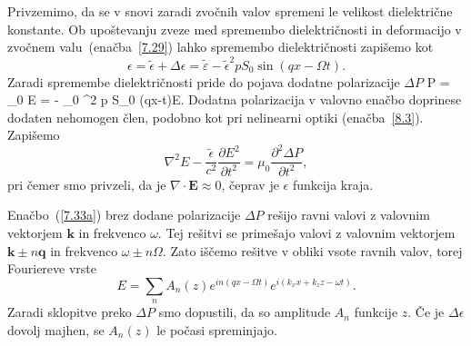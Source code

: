 Privzemimo, da se v snovi zaradi zvočnih valov spremeni le velikost
dielektrične konstante. Ob upoštevanju zveze med spremembo dielektričnosti in deformacijo
v zvočnem valu~(enačba~\ref{7.29}) lahko spremembo dielektričnosti
zapišemo kot  
\begin{equation}
\epsilon=\tilde{\epsilon}+\Delta\epsilon = 
\tilde{\varepsilon} -\tilde{\epsilon}^{2}pS_{0}\sin(qx-\Omega t).
\label{7.33}
\end{equation}
Zaradi spremembe dielektričnosti pride do pojava
dodatne polarizacije $\Delta P$
\beq
\Delta P = \varepsilon_0 \Delta \varepsilon E = - \varepsilon_0 
\tilde{\varepsilon}^2 p S_0 \sin(qx-\Omega t)E.
\eeq
Dodatna polarizacija v valovno enačbo doprinese dodaten nehomogen člen, podobno
kot pri nelinearni optiki (enačba~\ref{8.3}). Zapišemo
\begin{equation}
\nabla^{2}E-\frac{\tilde{\epsilon}}{c^{2}}{\frac{\partial E^{2}}
{\partial t^{2}}}=\mu_{0}{\frac{\partial^2 \Delta P}{\partial t^{2}}},
\label{7.33a}
\end{equation}
pri čemer smo privzeli, da je $\nabla\cdot\mathbf{E}\approx 0$, čeprav je
$\epsilon$ funkcija kraja. 

Enačbo~(\ref{7.33a}) brez dodane polarizacije $\Delta P$ rešijo ravni valovi 
z valovnim vektorjem $\mathbf{k}$ in frekvenco $\omega$. Tej rešitvi se 
primešajo valovi z valovnim vektorjem $\mathbf{k}\pm n\mathbf{q}$
in frekvenco $\omega\pm n\Omega$. Zato iščemo rešitve v obliki vsote
ravnih valov, torej Fouriereve vrste
\begin{equation}
E=\sum_{n}A_{n}(z)e^{in(qx-\Omega t)}e^{i(k_{x}x+k_{z}z-\omega t)}.
\label{7.34}
\end{equation}
Zaradi sklopitve preko $\Delta P$ smo dopustili, da so amplitude
$A_{n}$ funkcije $z$. Če je $\Delta\epsilon$ dovolj majhen, se $A_{n}(z)$
le počasi spreminjajo.

